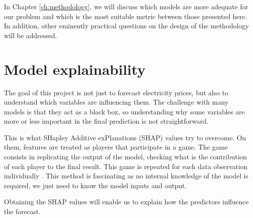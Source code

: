 \noindent In Chapter \ref{ch:methodology}, we will discuss which models are more adequate for our problem and which is the most suitable metric between those presented here. In addition, other eminently practical questions on the design of the methodology will be addressed.

\section{Model explainability}
%

The goal of this project is not just to forecast electricity prices, but also to understand which variables are influencing them. The challenge with many models is that they act as a black box, so understanding why some variables are more or less important in the final prediction is not straightforward.

This is what SHapley Additive exPlanations (SHAP) \cite{lundberg2017unified} values try to overcome. On them, features are treated as players that participate in a game. The game consists in replicating the output of the model, checking what is the contribution of each player to the final result. This game is repeated for each data observation individually \cite{shap-simplified}. This method is fascinating as no internal knowledge of the model is required, we just need to know the model inputs and output.

Obtaining the SHAP values will enable us to explain how the predictors influence the forecast.


